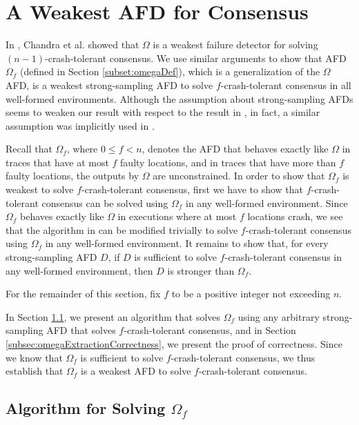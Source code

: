 \documentclass[11pt]{article}
\numberwithin{theorem}{section}
\newcommand{\FD}{D}
\begin{document}
\section{A Weakest AFD for Consensus}
\label{sec: wfd}



In \cite{chan:twfdf}, Chandra et al. showed that $\Omega$ is a weakest
failure detector for solving $(n-1)$-crash-tolerant consensus. We use
similar arguments to show that AFD  $\Omega_f$ (defined in Section
\ref{subset:omegaDef}), which is a generalization of the $\Omega$ AFD,
is a weakest strong-sampling AFD to solve
$f$-crash-tolerant consensus in all well-formed environments. Although
the assumption about strong-sampling AFDs seems to weaken our result
with respect to the result in \cite{chan:twfdf}, in fact, a similar
assumption was implicitly used in \cite{chan:twfdf}.



Recall that $\Omega_f$, where $0 \leq f <n$, denotes the AFD that
behaves exactly like $\Omega$ in traces that have at most $f$ faulty
locations, and in traces that have more than $f$ faulty locations, the outputs by $\Omega$ are unconstrained.
In order to show that $\Omega_f$ is weakest to solve
$f$-crash-tolerant consensus, first we have to show that
$f$-crash-tolerant consensus can be solved using $\Omega_f$ in any
well-formed environment. Since $\Omega_f$ behaves exactly like
$\Omega$ in executions where at most $f$ locations crash, we see that
the algorithm in \cite{chan:ufdfr} can be modified trivially to solve
$f$-crash-tolerant consensus using $\Omega_f$ in any well-formed
environment. It remains to show that, for every strong-sampling AFD
$\FD$, if $\FD$ is sufficient to solve $f$-crash-tolerant consensus in
any well-formed environment,  then $\FD$ is stronger than $\Omega_f$. 

For the remainder of this section, fix $f$ to be a positive integer not exceeding $n$.

In Section \ref{subsec:omegaExtraction}, we present an algorithm that
solves $\Omega_f$ using any arbitrary strong-sampling AFD that solves
$f$-crash-tolerant consensus, and in Section
\ref{subsec:omegaExtractionCorrectness}, we present the proof of
correctness. Since we know that $\Omega_f$ is sufficient to solve
$f$-crash-tolerant consensus, we thus establish that $\Omega_f$ is a
weakest AFD to solve $f$-crash-tolerant consensus.

\subsection{Algorithm for Solving $\Omega_f$}\label{subsec:omegaExtraction}
\end{document}
